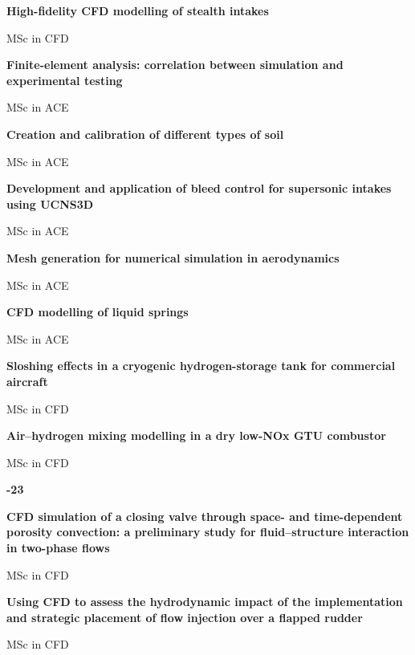 \documentclass[11pt,a4paper]{article}
\newlength{\cventrysep}
\newenvironment{cventry}{%
  \par\noindent\begin{minipage}{\linewidth}
  \RaggedRight\fontsize{9.8}{12.5}\selectfont
}{\end{minipage}\par\addvspace{\cventrysep}}
\newcommand{\cvtitle}[1]{{\bfseries #1\par}\vspace{1pt}}
\newcommand{\cvmeta}[1]{{\fontsize{9}{11.5}\selectfont\color{Muted}#1\par}\vspace{1pt}}
\newcommand{\cvyear}[1]{{\color{Teal}\bfseries\fontsize{11}{13}\selectfont #1\par}\vspace{6pt}}
\begin{document}
\begin{cventry}
\cvtitle{High-fidelity CFD modelling of stealth intakes}
\cvmeta{MSc in CFD}
\end{cventry}

\begin{cventry}
\cvtitle{Finite-element analysis: correlation between simulation and experimental testing}
\cvmeta{MSc in ACE}
\end{cventry}

\begin{cventry}
\cvtitle{Creation and calibration of different types of soil}
\cvmeta{MSc in ACE}
\end{cventry}

\begin{cventry}
\cvtitle{Development and application of bleed control for supersonic intakes using UCNS3D}
\cvmeta{MSc in ACE}
\end{cventry}

\begin{cventry}
\cvtitle{Mesh generation for numerical simulation in aerodynamics}
\cvmeta{MSc in ACE}
\end{cventry}

\begin{cventry}
\cvtitle{CFD modelling of liquid springs}
\cvmeta{MSc in ACE}
\end{cventry}

\begin{cventry}
\cvtitle{Sloshing effects in a cryogenic hydrogen-storage tank for commercial aircraft}
\cvmeta{MSc in CFD}
\end{cventry}

\begin{cventry}
\cvtitle{Air--hydrogen mixing modelling in a dry low-NOx GTU combustor}
\cvmeta{MSc in CFD}
\end{cventry}

\begin{cventry}
\cvyear{2022-23}
\cvtitle{CFD simulation of a closing valve through space- and time-dependent porosity convection: a preliminary study for fluid--structure interaction in two-phase flows}
\cvmeta{MSc in CFD}
\end{cventry}

\begin{cventry}
\cvtitle{Using CFD to assess the hydrodynamic impact of the implementation and strategic placement of flow injection over a flapped rudder}
\cvmeta{MSc in CFD}
\end{cventry}
\end{document}
